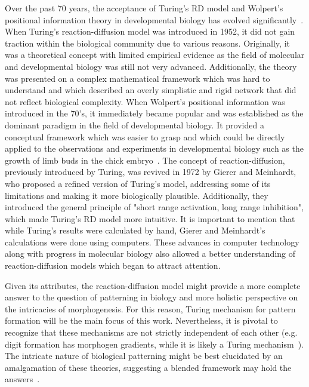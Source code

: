 Over the past 70 years, the acceptance of Turing's \acrfull{RD} model and Wolpert's positional information theory in developmental biology has evolved significantly~\parencite{green2015positional}.
When Turing's reaction-diffusion model was introduced in 1952, it did not gain traction within the biological community due to various reasons.
Originally, it was a theoretical concept with limited empirical evidence as the field of molecular and developmental biology was still not very advanced.
Additionally, the theory was presented on a complex mathematical framework which was hard to understand and which described an overly simplistic and rigid network that did not reflect biological complexity.
When Wolpert's positional information was introduced in the 70's, it immediately became popular and was established as the dominant paradigm in the field of developmental biology.
It provided a conceptual framework which was easier to grasp and which could be directly applied to the observations and experiments in developmental biology such as the growth of limb buds in the chick embryo~\parencite{saunders1968ectodermal}.
The concept of reaction-diffusion, previously introduced by Turing, was revived in 1972 by Gierer and Meinhardt, who proposed a refined version of Turing's model, addressing some of its limitations and making it more biologically plausible.
Additionally, they introduced the general principle of "short range activation, long range inhibition", which made Turing's RD model more intuitive.
It is important to mention that while Turing's results were calculated by hand, Gierer and Meinhardt's calculations were done using computers.
These advances in computer technology along with progress in molecular biology also allowed a better understanding of reaction-diffusion models which began to attract attention.

Given its attributes, the reaction-diffusion model might provide a more complete answer to the question of patterning in biology and more holistic perspective on the intricacies of morphogenesis.
For this reason, Turing mechanism for pattern formation will be the main focus of this work.
Nevertheless, it is pivotal to recognize that these mechanisms are not strictly independent of each other (e.g. digit formation has morphogen gradients, while it is likely a Turing mechanism~\parencite{Raspopovic1}).
The intricate nature of biological patterning might be best elucidated by an amalgamation of these theories, suggesting a blended framework may hold the answers~\parencite{Green2015}.


